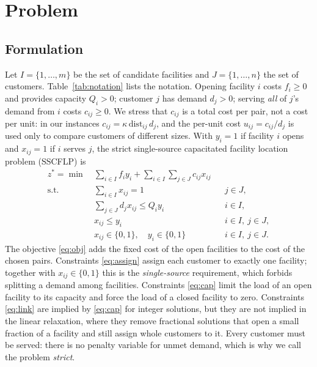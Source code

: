 \section{Problem}\label{sec:problem}

\subsection{Formulation}
Let $I=\{1,\dots,m\}$ be the set of candidate facilities and $J=\{1,\dots,n\}$ the set of
customers. Table~\ref{tab:notation} lists the notation. Opening facility $i$ costs $f_i\ge 0$ and
provides capacity $Q_i>0$; customer $j$ has demand $d_j>0$; serving \emph{all} of $j$'s demand
from $i$ costs $c_{ij}\ge 0$. We stress that $c_{ij}$ is a total cost per pair, not a cost per
unit: in our instances $c_{ij}=\kappa\,\mathrm{dist}_{ij}\,d_j$, and the per-unit cost
$u_{ij}=c_{ij}/d_j$ is used only to compare customers of different sizes. With $y_i=1$ if
facility $i$ opens and $x_{ij}=1$ if $i$ serves $j$, the strict single-source capacitated
facility location problem (SSCFLP) is
\begin{align}
z^\ast=\min\ & \sum_{i\in I} f_i y_i + \sum_{i\in I}\sum_{j\in J} c_{ij} x_{ij} \label{eq:obj}\\
\text{s.t.}\ & \sum_{i\in I} x_{ij} = 1 && j\in J, \label{eq:assign}\\
& \sum_{j\in J} d_j x_{ij} \le Q_i y_i && i\in I, \label{eq:cap}\\
& x_{ij} \le y_i && i\in I,\ j\in J, \label{eq:link}\\
& x_{ij}\in\{0,1\},\quad y_i \in \{0,1\} && i\in I,\ j\in J. \label{eq:int}
\end{align}
The objective \eqref{eq:obj} adds the fixed cost of the open facilities to the cost of the chosen
pairs. Constraints \eqref{eq:assign} assign each customer to exactly one facility; together with
$x_{ij}\in\{0,1\}$ this is the \emph{single-source} requirement, which forbids splitting a demand
among facilities. Constraints \eqref{eq:cap} limit the load of an open facility to its capacity
and force the load of a closed facility to zero. Constraints \eqref{eq:link} are implied by
\eqref{eq:cap} for integer solutions, but they are not implied in the linear relaxation, where
they remove fractional solutions that open a small fraction of a facility and still assign whole
customers to it. Every customer must be served: there is no penalty variable for unmet demand,
which is why we call the problem \emph{strict}.

